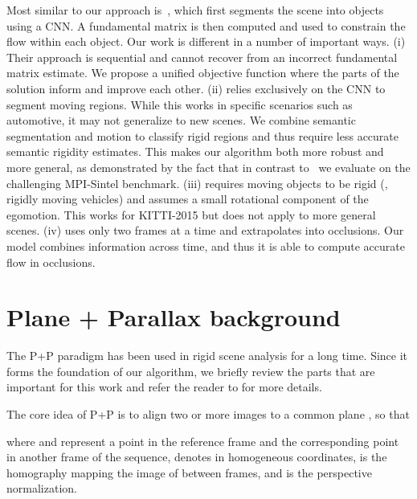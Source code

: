 \documentclass[10pt,twocolumn,letterpaper]{article}
\begin{document}
Most similar to our approach is~\cite{Bai:2016:SemanticDeepFlow}, which first segments the scene into objects using a CNN.
A fundamental matrix is then computed and used to constrain the flow within each object.
Our work is different in a number of important ways.
(i) Their approach is sequential and cannot recover from an incorrect fundamental matrix estimate.
We propose a unified objective function where the parts of the solution inform and improve each other.
(ii) \cite{Bai:2016:SemanticDeepFlow} relies exclusively on the CNN to segment moving regions.
While this works in specific scenarios such as automotive, it may not
generalize to new scenes. 
We combine semantic segmentation and motion to classify
rigid regions and thus require less accurate semantic rigidity estimates.
This makes our algorithm both more robust and more general, as demonstrated by the fact that in contrast to~\cite{Bai:2016:SemanticDeepFlow} we evaluate on the challenging MPI-Sintel benchmark.
(iii) \cite{Bai:2016:SemanticDeepFlow} requires moving objects to be
rigid (\ie, rigidly moving vehicles) and assumes a small rotational
component of the egomotion.  
This works for KITTI-2015 but does not apply to more general scenes.
(iv) \cite{Bai:2016:SemanticDeepFlow} uses only two frames at a time and extrapolates into occlusions.
Our model combines information across time, and thus it is able to compute accurate flow in occlusions.
















 \section{Plane + Parallax background}
\noindent
The P+P paradigm has been used in rigid scene analysis for a long time.
Since it forms the foundation of our algorithm, we briefly review the parts that are important for this work and refer the reader to \cite{Irani:1998:ReferenceFrames,Sawhney:1994:3DGeometryPPP} for more details.

The core idea of P+P is to align two or more images to a common plane , so that

where  and  represent a point in the reference frame and the corresponding point in another frame of the sequence,  denotes  in homogeneous coordinates,  is the homography mapping the image of  between frames, and  is the perspective normalization.
\end{document}
